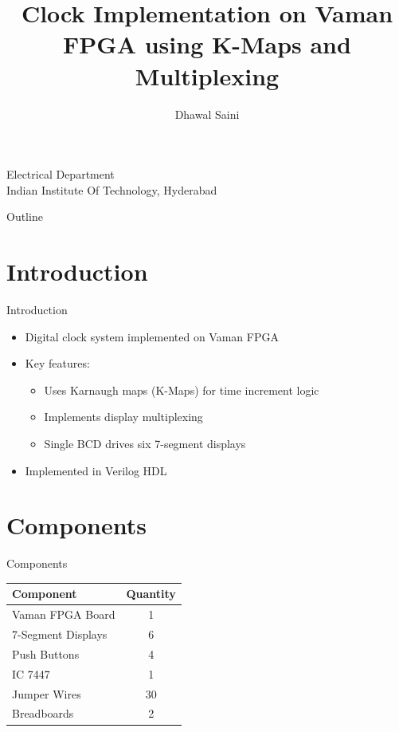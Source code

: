 \documentclass{beamer}
\title[Clock on Vaman FPGA]{Clock Implementation on Vaman FPGA using K-Maps and Multiplexing}
\author{Dhawal Saini\\
}
\begin{document}
\begin{frame}
    \titlepage
    \centering
    Electrical Department\\
    Indian Institute Of Technology, Hyderabad
\end{frame}

\begin{frame}{Outline}
    \tableofcontents
\end{frame}

\section{Introduction}
\begin{frame}{Introduction}
    \begin{itemize}
        \item Digital clock system implemented on Vaman FPGA
        \item Key features:
        \begin{itemize}
            \item Uses Karnaugh maps (K-Maps) for time increment logic
            \item Implements display multiplexing
            \item Single BCD drives six 7-segment displays
        \end{itemize}
        \item Implemented in Verilog HDL
    \end{itemize}
\end{frame}

\section{Components}
\begin{frame}{Components}
    \begin{table}
        \centering
        \begin{tabular}{|l|c|}
        \hline
        \textbf{Component} & \textbf{Quantity}\\
        \hline
        Vaman FPGA Board & 1\\
        \hline
        7-Segment Displays & 6\\
        \hline
        Push Buttons & 4\\
        \hline
        IC 7447 & 1\\
        \hline
        Jumper Wires & 30\\
        \hline
        Breadboards & 2\\
        \hline
        \end{tabular}
    \end{table}
\end{frame}
\end{document}

